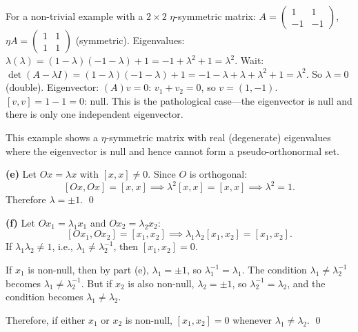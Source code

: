 \documentclass[12pt]{article}
\begin{document}
For a non-trivial example with a $2\times 2$ $\eta$-symmetric matrix: $A = \begin{pmatrix} 1 & 1 \\ -1 & -1\end{pmatrix}$, $\eta A = \begin{pmatrix} 1 & 1 \\ 1 & 1\end{pmatrix}$ (symmetric). Eigenvalues: $\lambda(\lambda) = (1-\lambda)(-1-\lambda)+1 = -1+\lambda^2+1 = \lambda^2$. Wait: $\det(A-\lambda I) = (1-\lambda)(-1-\lambda)+1 = -1-\lambda+\lambda+\lambda^2+1 = \lambda^2$. So $\lambda = 0$ (double). Eigenvector: $(A)v = 0$: $v_1+v_2 = 0$, so $v = (1,-1)$. $[v,v] = 1 - 1 = 0$: null. This is the pathological case---the eigenvector is null and there is only one independent eigenvector.

This example shows a $\eta$-symmetric matrix with real (degenerate) eigenvalues where the eigenvector is null and hence cannot form a pseudo-orthonormal set.

\textbf{(e)} Let $Ox = \lambda x$ with $[x, x] \neq 0$. Since $O$ is orthogonal:
\[
[Ox, Ox] = [x, x] \implies \lambda^2 [x, x] = [x, x] \implies \lambda^2 = 1.
\]
Therefore $\lambda = \pm 1$. \qed

\textbf{(f)} Let $Ox_1 = \lambda_1 x_1$ and $Ox_2 = \lambda_2 x_2$:
\[
[Ox_1, Ox_2] = [x_1, x_2] \implies \lambda_1\lambda_2 [x_1, x_2] = [x_1, x_2].
\]
If $\lambda_1\lambda_2 \neq 1$, i.e., $\lambda_1 \neq \lambda_2^{-1}$, then $[x_1, x_2] = 0$. \checkmark

If $x_1$ is non-null, then by part (e), $\lambda_1 = \pm 1$, so $\lambda_1^{-1} = \lambda_1$. The condition $\lambda_1 \neq \lambda_2^{-1}$ becomes $\lambda_1 \neq \lambda_2^{-1}$. But if $x_2$ is also non-null, $\lambda_2 = \pm 1$, so $\lambda_2^{-1} = \lambda_2$, and the condition becomes $\lambda_1 \neq \lambda_2$.

Therefore, if either $x_1$ or $x_2$ is non-null, $[x_1, x_2] = 0$ whenever $\lambda_1 \neq \lambda_2$. \qed
\end{document}
